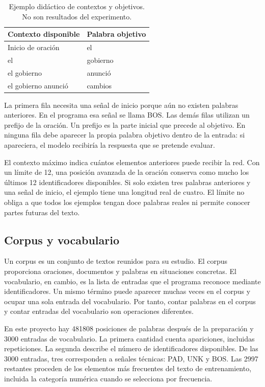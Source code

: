 \begin{table}[tb]
\caption{Ejemplo didáctico de contextos y objetivos. No son resultados del experimento.}
\centering
\begin{tabular}{p{}p{}}
\toprule Contexto disponible & Palabra objetivo\\\midrule
Inicio de oración & el\\
el & gobierno\\
el gobierno & anunció\\
el gobierno anunció & cambios\\\bottomrule
\end{tabular}
\end{table}

La primera fila necesita una señal de inicio porque aún no existen palabras anteriores. En el programa esa señal se llama BOS. Las demás filas utilizan un prefijo de la oración. Un prefijo es la parte inicial que precede al objetivo. En ninguna fila debe aparecer la propia palabra objetivo dentro de la entrada: si apareciera, el modelo recibiría la respuesta que se pretende evaluar.

El contexto máximo indica cuántos elementos anteriores puede recibir la red. Con un límite de 12, una posición avanzada de la oración conserva como mucho los últimos 12 identificadores disponibles. Si solo existen tres palabras anteriores y una señal de inicio, el ejemplo tiene una longitud real de cuatro. El límite no obliga a que todos los ejemplos tengan doce palabras reales ni permite conocer partes futuras del texto.

\subsection{Corpus y vocabulario}
Un corpus es un conjunto de textos reunidos para su estudio. El corpus proporciona oraciones, documentos y palabras en situaciones concretas. El vocabulario, en cambio, es la lista de entradas que el programa reconoce mediante identificadores. Un mismo término puede aparecer muchas veces en el corpus y ocupar una sola entrada del vocabulario. Por tanto, contar palabras en el corpus y contar entradas del vocabulario son operaciones diferentes.

En este proyecto hay 481808 posiciones de palabras después de la preparación y 3000 entradas de vocabulario. La primera cantidad cuenta apariciones, incluidas repeticiones. La segunda describe el número de identificadores disponibles. De las 3000 entradas, tres corresponden a señales técnicas: PAD, UNK y BOS. Las 2997 restantes proceden de los elementos más frecuentes del texto de entrenamiento, incluida la categoría numérica cuando se selecciona por frecuencia.

